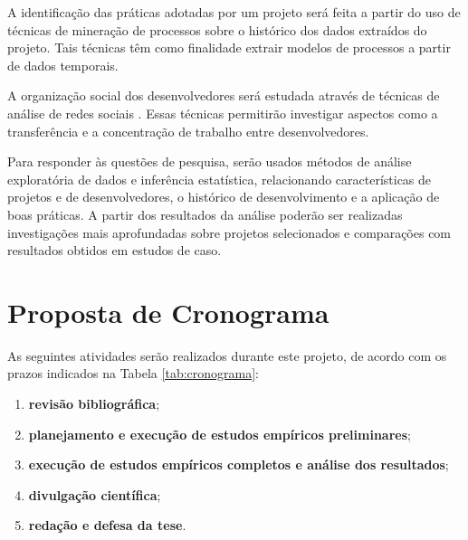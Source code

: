\documentclass{article}
\begin{document}
A identificação das práticas adotadas por um projeto será feita a partir do uso
de técnicas de mineração de processos \cite{rubin2007} sobre o histórico dos
dados extraídos do projeto. Tais técnicas têm como finalidade extrair modelos de
processos a partir de dados temporais.

A organização social dos desenvolvedores será estudada através de técnicas de
análise de redes sociais \cite{newman2003}. Essas técnicas permitirão
investigar aspectos como a transferência e a concentração de trabalho entre
desenvolvedores.

Para responder às questões de pesquisa, serão usados métodos de análise
exploratória de dados e inferência estatística, relacionando características de
projetos e de desenvolvedores, o histórico de desenvolvimento e a aplicação de
boas práticas. A partir dos resultados da análise poderão ser realizadas
investigações mais aprofundadas sobre projetos selecionados e comparações com
resultados obtidos em estudos de caso.


\section{Proposta de Cronograma}
\newcommand{\newrow}{\\\hline}
\newcommand{\x}{$\bullet$}

As seguintes atividades serão realizados durante este projeto, de acordo com os
prazos indicados na Tabela \ref{tab:cronograma}:

\begin{enumerate}
  \item \label{prevista:estudos}
    \textbf{revisão bibliográfica};
  \item \label{prevista:preliminares}
    \textbf{planejamento e execução de estudos empíricos preliminares};
  \item \label{prevista:experimentos}
    \textbf{execução de estudos empíricos completos e análise dos resultados};
  \item \label{prevista:artigos}
    \textbf{divulgação científica};
  \item \label{prevista:redacao}
    \textbf{redação e defesa da tese}.
\end{enumerate}
\end{document}
